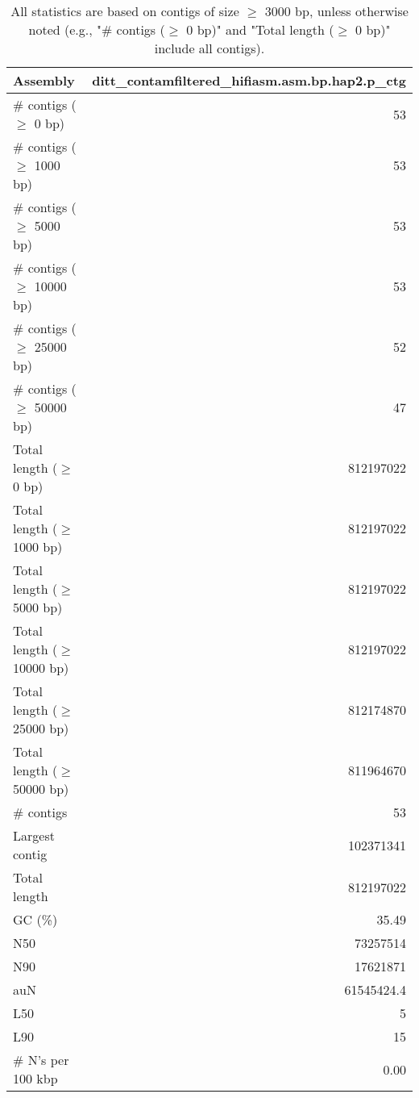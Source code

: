 \documentclass[12pt,a4paper]{article}
\begin{document}
\begin{table}[ht]
\begin{center}
\caption{All statistics are based on contigs of size $\geq$ 3000 bp, unless otherwise noted (e.g., "\# contigs ($\geq$ 0 bp)" and "Total length ($\geq$ 0 bp)" include all contigs).}
\begin{tabular}{|l*{1}{|r}|}
\hline
Assembly & ditt\_contamfiltered\_hifiasm.asm.bp.hap2.p\_ctg \\ \hline
\# contigs ($\geq$ 0 bp) & 53 \\ \hline
\# contigs ($\geq$ 1000 bp) & 53 \\ \hline
\# contigs ($\geq$ 5000 bp) & 53 \\ \hline
\# contigs ($\geq$ 10000 bp) & 53 \\ \hline
\# contigs ($\geq$ 25000 bp) & 52 \\ \hline
\# contigs ($\geq$ 50000 bp) & 47 \\ \hline
Total length ($\geq$ 0 bp) & 812197022 \\ \hline
Total length ($\geq$ 1000 bp) & 812197022 \\ \hline
Total length ($\geq$ 5000 bp) & 812197022 \\ \hline
Total length ($\geq$ 10000 bp) & 812197022 \\ \hline
Total length ($\geq$ 25000 bp) & 812174870 \\ \hline
Total length ($\geq$ 50000 bp) & 811964670 \\ \hline
\# contigs & 53 \\ \hline
Largest contig & 102371341 \\ \hline
Total length & 812197022 \\ \hline
GC (\%) & 35.49 \\ \hline
N50 & 73257514 \\ \hline
N90 & 17621871 \\ \hline
auN & 61545424.4 \\ \hline
L50 & 5 \\ \hline
L90 & 15 \\ \hline
\# N's per 100 kbp & 0.00 \\ \hline
\end{tabular}
\end{center}
\end{table}
\end{document}
